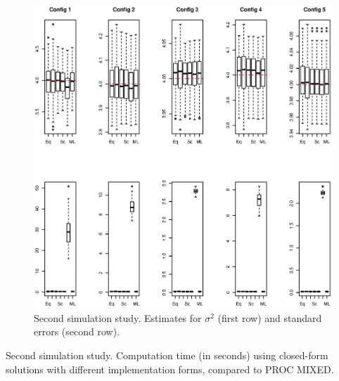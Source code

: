 \documentclass[11pt,a5paper,twoside]{book}
\begin{document}
{\begin{figure}
\centering
\includegraphics[width=\textwidth]{fig_sigma2.eps}
\caption{\small \linespread{1.1}  Second simulation study. Estimates for $\sigma^2$ (first row) and standard errors (second row).} \label{fig_sigma2}
\end{figure}

\begin{table}[ht]
\centering
\caption{\small \linespread{1.1} Second simulation study. Computation time (in seconds) using closed-form solutions with different implementation forms, compared to PROC MIXED.}

\vspace*{2mm}


\end{table}}
\end{document}
